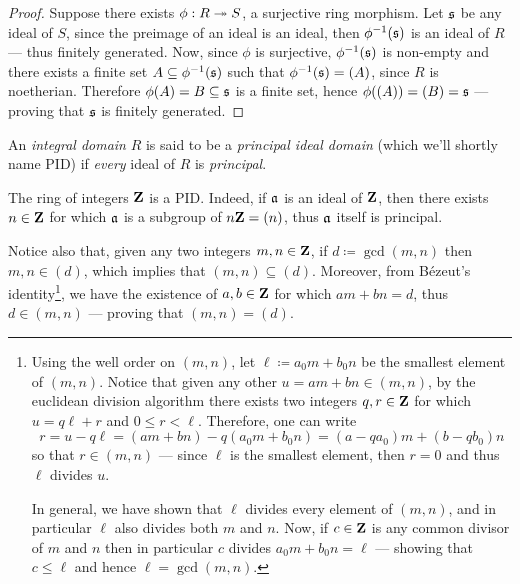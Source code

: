 \begin{proof}
Suppose there exists \(\phi: R \twoheadrightarrow S\), a surjective ring morphism. Let
\(\mathfrak{s}\) be any ideal of \(S\), since the preimage of an ideal is an ideal,
then \(\phi^{-1}(\mathfrak{s})\) is an ideal of \(R\) --- thus finitely
generated. Now, since \(\phi\) is surjective, \(\phi^{-1}(\mathfrak{s})\) is
non-empty and there exists a finite set \(A \subseteq \phi^{-1}(\mathfrak{s})\)
such that \(\phi^{-1}(\mathfrak{s}) = (A)\), since \(R\) is noetherian. Therefore
\(\phi(A) = B \subseteq \mathfrak{s}\) is a finite set, hence
\(\phi((A)) = (B) = \mathfrak{s}\) --- proving that \(\mathfrak{s}\) is finitely
generated.
\end{proof}

\begin{definition}
\label{def:PID}
An \emph{integral domain} \(R\) is said to be a \emph{principal ideal domain}
(which we'll shortly name PID) if \emph{every} ideal of \(R\) is
\emph{principal}.
\end{definition}

\begin{example}
\label{exp:integers-are-PID}
The ring of integers \(\mathbf{Z}\) is a PID. Indeed, if \(\mathfrak{a}\) is an ideal of
\(\mathbf{Z}\), then there exists \(n \in \mathbf{Z}\) for which \(\mathfrak{a}\) is a subgroup of
\(n \mathbf{Z} = (n)\), thus \(\mathfrak{a}\) itself is principal.

Notice also that, given any two integers \(m, n \in \mathbf{Z}\), if
\(d \coloneq \gcd(m, n)\) then \(m, n \in (d)\), which implies that
\((m, n) \subseteq (d)\). Moreover, from Bézeut's identity\footnote{Using the
  well order on \((m, n)\), let \(\ell
  \coloneq a_0 m + b_0 n\) be the smallest element of \((m, n)\). Notice that
  given any other \(u = a m + b n \in (m, n)\), by the euclidean division
  algorithm there exists two integers \(q, r \in \mathbf{Z}\) for which \(u = q \ell +
  r\) and \(0 \leq r < \ell\). Therefore, one can write
  \[
  r = u - q \ell
  = (a m + b n) - q (a_0 m + b_0 n) = (a - q a_0) m + (b - q b_0) n
  \]
  so that \(r \in (m, n)\) --- since \(\ell\) is the smallest element, then \(r
  = 0\) and thus \(\ell\) divides \(u\).

  In general, we have shown that \(\ell\) divides every element of \((m, n)\),
  and in particular \(\ell\) also divides both \(m\) and \(n\). Now, if \(c \in
  \mathbf{Z}\) is any common divisor of \(m\) and \(n\) then in particular \(c\) divides
  \(a_0 m + b_0 n = \ell\) --- showing that \(c \leq \ell\) and hence \(\ell =
  \gcd(m, n)\).
},
we have the existence of \(a, b \in \mathbf{Z}\) for which \(a m + b n = d\), thus
\(d \in (m, n)\) --- proving that \((m, n) = (d)\).
\end{example}

